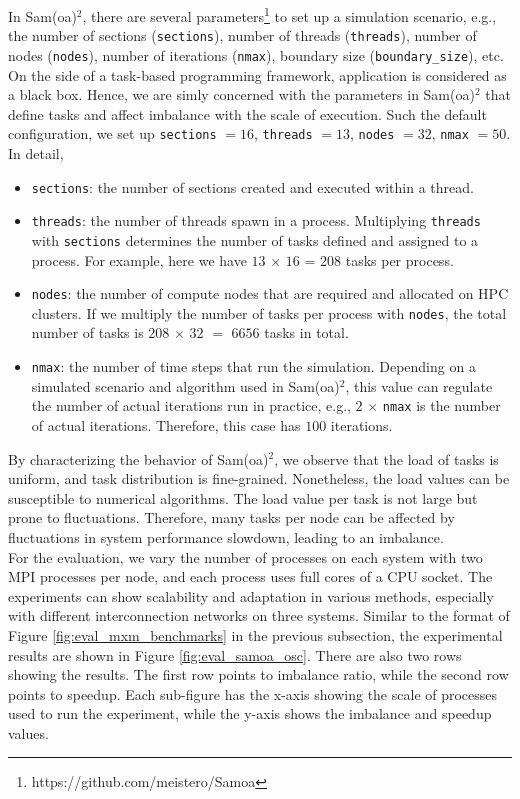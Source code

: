 In Sam(oa)$^2$, there are several parameters\footnote{https://github.com/meistero/Samoa} to set up a simulation scenario, e.g., the number of sections (\texttt{sections}), number of threads (\texttt{threads}), number of nodes (\texttt{nodes}), number of iterations (\texttt{nmax}), boundary size (\texttt{boundary\_size}), etc. On the side of a task-based programming framework, application is considered as a black box. Hence, we are simly concerned with the parameters in Sam(oa)$^2$ that define tasks and affect imbalance with the scale of execution. Such the default configuration, we set up \texttt{sections} $=16$, \texttt{threads} $=13$, \texttt{nodes} $=32$, \texttt{nmax} $=50$. In detail,
\begin{itemize}
	\item \texttt{sections}: the number of sections created and executed within a thread.
	\item \texttt{threads}: the number of threads spawn in a process. Multiplying \texttt{threads} with \texttt{sections} determines the number of tasks defined and assigned to a process. For example, here we have $13$ $\times$ $16$ = $208$ tasks per process.
	\item \texttt{nodes}: the number of compute nodes that are required and allocated on HPC clusters. If we multiply the number of tasks per process with \texttt{nodes}, the total number of tasks is $208$ $\times$ $32$ $=$ $6656$ tasks in total.
	\item \texttt{nmax}: the number of time steps that run the simulation. Depending on a simulated scenario and algorithm used in Sam(oa)$^2$, this value can regulate the number of actual iterations run in practice, e.g., $2$ $\times$ \texttt{nmax} is the number of actual iterations. Therefore, this case has $100$ iterations.
\end{itemize}

By characterizing the behavior of Sam(oa)$^2$, we observe that the load of tasks is uniform, and task distribution is fine-grained. Nonetheless, the load values can be susceptible to numerical algorithms. The load value per task is not large but prone to fluctuations. Therefore, many tasks per node can be affected by fluctuations in system performance slowdown, leading to an imbalance.\\

For the evaluation, we vary the number of processes on each system with two MPI processes per node, and each process uses full cores of a CPU socket. The experiments can show scalability and adaptation in various methods, especially with different interconnection networks on three systems. Similar to the format of Figure \ref{fig:eval_mxm_benchmarks} in the previous subsection, the experimental results are shown in Figure \ref{fig:eval_samoa_osc}. There are also two rows showing the results. The first row points to imbalance ratio, while the second row points to speedup. Each sub-figure has the x-axis showing the scale of processes used to run the experiment, while the y-axis shows the imbalance and speedup values.\\

